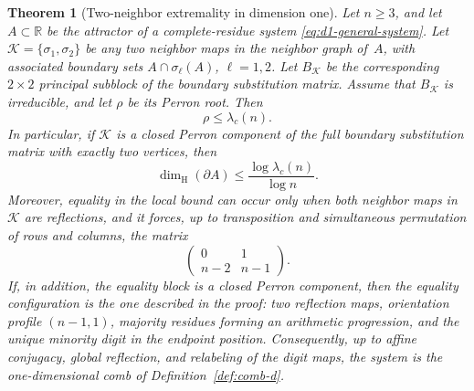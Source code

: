 \documentclass{amsart}
\newtheorem{theorem}{Theorem}[section]
\theoremstyle{definition}
\theoremstyle{remark}
\newcommand{\R}{\mathbb{R}}
\newcommand{\dH}{\dim_{\mathrm{H}}}
\begin{document}
\begin{theorem}[Two-neighbor extremality in dimension one]
\label{thm:d1-two-neighbor-extremal}
Let \(n\ge3\), and let \(A\subset\R\) be the attractor of a
complete-residue system \eqref{eq:d1-general-system}.  Let
\(\mathcal K=\{\sigma_1,\sigma_2\}\) be any two neighbor maps in the
neighbor graph of~\(A\), with associated boundary sets
\(A\cap\sigma_\ell(A)\), \(\ell=1,2\).  Let \(B_{\mathcal K}\) be the
corresponding \(2\times2\) principal subblock of the boundary
substitution matrix.  Assume that \(B_{\mathcal K}\) is irreducible,
and let \(\rho\) be its Perron root.
Then
\[
  \rho \le \lambda_c(n).
\]
In particular, if \(\mathcal K\) is a closed Perron component of the full
boundary substitution matrix with exactly two vertices, then
\[
  \dH(\partial A) \le \frac{\log \lambda_c(n)}{\log n}.
\]
Moreover, equality in the local bound can occur only when both neighbor
maps in \(\mathcal K\) are reflections, and it forces, up to
transposition and simultaneous permutation of rows and columns, the
matrix
\[
  \begin{pmatrix}0&1\\ n-2&n-1\end{pmatrix}.
\]
If, in addition, the equality block is a closed Perron component, then
the equality configuration is the one described in the proof: two
reflection maps, orientation profile $(n-1,1)$, majority residues
forming an arithmetic progression, and the unique minority digit in the
endpoint position.  Consequently, up to affine conjugacy, global
reflection, and relabeling of the digit maps, the system is the
one-dimensional comb of Definition~\ref{def:comb-d}.
\end{theorem}
\end{document}
